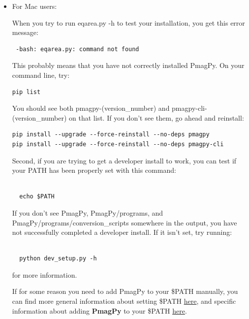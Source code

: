 \documentclass[11pt]{book}
\begin{document}
{{{\begin{enumerate}



\begin{itemize}

\item For Mac users:


When you try to run eqarea.py -h to test your installation, you get this error message:

\begin{verbatim} -bash: eqarea.py: command not found
\end{verbatim}

This probably means that you have not correctly installed PmagPy.  On your command line, try:

\begin{verbatim}
pip list
\end{verbatim}

You should see both pmagpy-(version_number) and pmagpy-cli-(version_number) on that list.  If you don't see them, go ahead and reinstall:

\begin{verbatim}
pip install --upgrade --force-reinstall --no-deps pmagpy
pip install --upgrade --force-reinstall --no-deps pmagpy-cli
\end{verbatim}

Second, if you are trying to get a developer install to work, you can test if your PATH has been properly set with this command:\begin{verbatim}

  echo $PATH

\end{verbatim}

If you don't see PmagPy, PmagPy/programs, and PmagPy/programs/conversion_scripts somewhere in the output, you have not successfully completed a developer install.  If it isn't set, try running:\begin{verbatim}

  python dev_setup.py -h

\end{verbatim}

for more information.

If for some reason you need to add PmagPy to your \$PATH manually, you can find more general information about setting \$PATH \href{https://stackoverflow.com/questions/14637979/how-to-permanently-set-path-on-linux-unix}{here}, and specific information about adding {\bf PmagPy} to your \$PATH \href{#setting_path}{here}.



\end{itemize}
\end{enumerate}}}}
\end{document}
